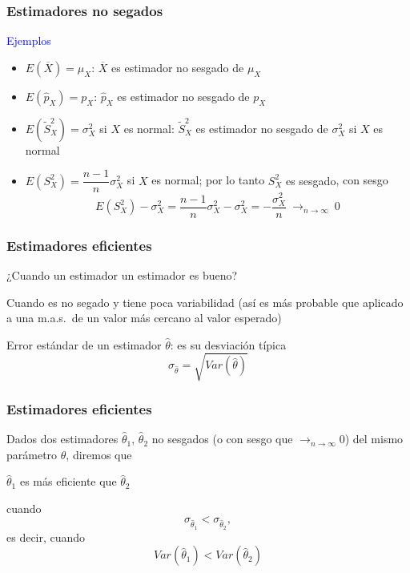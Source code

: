 \documentclass[12pt,t]{beamer}
\newcommand{\blue}[1]{\textcolor{blue}{#1}}
\renewcommand{\emph}[1]{{\color{red}#1}}
\def\tendeix{{\displaystyle\mathop{\longrightarrow}_{\scriptscriptstyle
n\to\infty}}}
\theoremstyle{plain}
\theoremstyle{definition}
\begin{document}
\begin{frame}
\frametitle{Estimadores no segados}


\blue{Ejemplos}

\begin{itemize}
\item $E(\overline{X})=\mu_X$: $\overline{X}$ es estimador no sesgado de $\mu_X$
\medskip

\item $E(\widehat{p}_X)=p_X$: $\widehat{p}_X$ es estimador no sesgado de $p_X$
\medskip

\item $E(\widetilde{S}_{X}^2)=\sigma_X^2$ si $X$ es normal: $\widetilde{S}_{X}^2$ es estimador no sesgado de $\sigma_X^2$ si  $X$ es normal
\medskip

\item $E({S}_{X}^2)=\dfrac{n-1}{n}\sigma_X^2$ si $X$ es normal; por lo tanto 
\emph{${S}_{X}^2$ es sesgado}, con sesgo
$$
E({S}_{X}^2)-\sigma_X^2=\dfrac{n-1}{n}\sigma_X^2-\sigma_X^2=-\dfrac{\sigma_X^2}{n}\ \tendeix\ 0
$$

\end{itemize}

\end{frame}


\begin{frame}
\frametitle{Estimadores eficientes}

¿Cuando un estimador  un estimador es \emph{bueno}?
\medskip

Cuando es no segado y tiene poca variabilidad  (así es más probable que aplicado a una m.a.s.\ de un valor más cercano al valor esperado)
\medskip

\emph{Error estándar de un estimador $\widehat{\theta}$}:  es su desviación típica
$$\sigma_{\widehat{\theta}}=\sqrt{Var(\widehat{\theta})}$$
\medskip

\end{frame}


\begin{frame}
\frametitle{Estimadores eficientes}

Dados dos estimadores $\widehat{\theta}_1$, $\widehat{\theta}_2$ no sesgados (o con sesgo  que $\tendeix 0$) del mismo parámetro  $\theta$, diremos que 
\begin{center}
$\widehat{\theta}_1$ es \emph{más eficiente} que $\widehat{\theta}_2$
\end{center}
 cuando $$\sigma_{\widehat{\theta}_1}< \sigma_{\widehat{\theta}_2},$$  es decir, cuando $$Var(\widehat{\theta}_1)< Var(\widehat{\theta}_2)$$


\end{frame}
\end{document}
